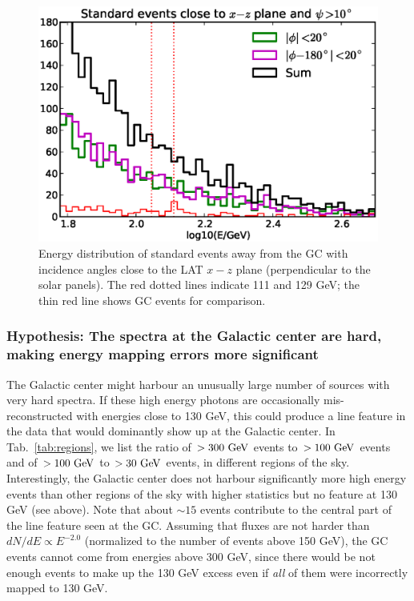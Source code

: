 \documentclass[aps,twocolumn,prd,superscriptaddress,showpacs,nofootinbib,fixfloat]{revtex4}
\newcommand{\GeV}{{\rm ~GeV}}
\begin{document}
\begin{figure}
  \centering
  \includegraphics[width=1.0\linewidth]{plots/phi_energy.eps}
  \caption{Energy distribution of standard events away from the GC with
  incidence angles close to the LAT $x-z$ plane (perpendicular to the solar
  panels). The red dotted lines indicate 111 and 129 GeV; the thin red line
  shows GC events for comparison.}
  \label{fig:spectrum_phi}
\end{figure}

\subsubsection{Hypothesis: The spectra at the Galactic
center are hard, making energy mapping errors more
significant}

The Galactic center might harbour an unusually large number
of sources with very hard spectra. If these high energy
photons are occasionally mis-reconstructed with energies
close to 130 GeV, this could produce a line feature in the
data that would dominantly show up at the Galactic center.
In Tab.~\ref{tab:regions}, we list the ratio of $>300\GeV$
events to $>100\GeV$ events and of $>100\GeV$ to $>30\GeV$
events, in different regions of the sky.  Interestingly, the
Galactic center does not harbour significantly more high
energy events than other regions of the sky with higher
statistics but no feature at 130 GeV (see above). Note that
about $\sim15$ events contribute to the central part of the
line feature seen at the GC. Assuming that fluxes are not
harder than $dN/dE \propto E^{-2.0}$ (normalized to the
number of events above 150 GeV), the GC events cannot come
from energies above 300 GeV, since there would be not enough
events to make up the 130 GeV excess even if \emph{all} of
them were incorrectly mapped to 130 GeV. 
\end{document}
